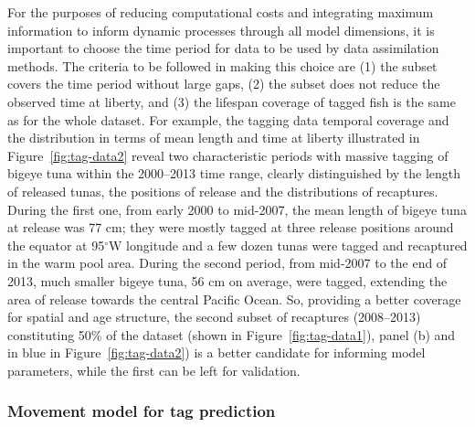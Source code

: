 For the purposes of reducing computational costs and integrating maximum information to inform dynamic processes through all model dimensions, it is important to choose the time period for data to be used by data assimilation methods. The criteria to be followed in making this choice are (1) the subset covers the time period without large gaps, (2) the subset does not reduce the observed time at liberty, and (3) the lifespan coverage of tagged fish is the same as for the whole dataset. For example, the tagging data temporal coverage and the distribution in terms of mean length and time at liberty illustrated in Figure~\ref{fig:tag-data2} reveal two characteristic periods with massive tagging of bigeye tuna within the 2000--2013 time range, clearly distinguished by the length of released tunas, the positions of release and the distributions of recaptures. During the first one, from early 2000 to mid-2007, the mean length of bigeye tuna at release was 77 cm; they were mostly tagged at three release positions around the equator at 95$^\circ$W longitude and a few dozen  tunas were tagged and recaptured in the warm pool area. During the second period, from mid-2007 to the end of 2013, much smaller bigeye tuna, 56 cm on average, were tagged, extending the area of release towards the central Pacific Ocean. So, providing a better coverage for spatial and age structure, the second subset of recaptures (2008--2013) constituting 50\% of the dataset (shown in Figure~\ref{fig:tag-data1}), panel (b) and in blue in Figure~\ref{fig:tag-data2}) is a better candidate for informing model parameters, while the first can be left for validation. 


\subsubsection{Movement model for tag prediction}\label{sec:model-tags}

